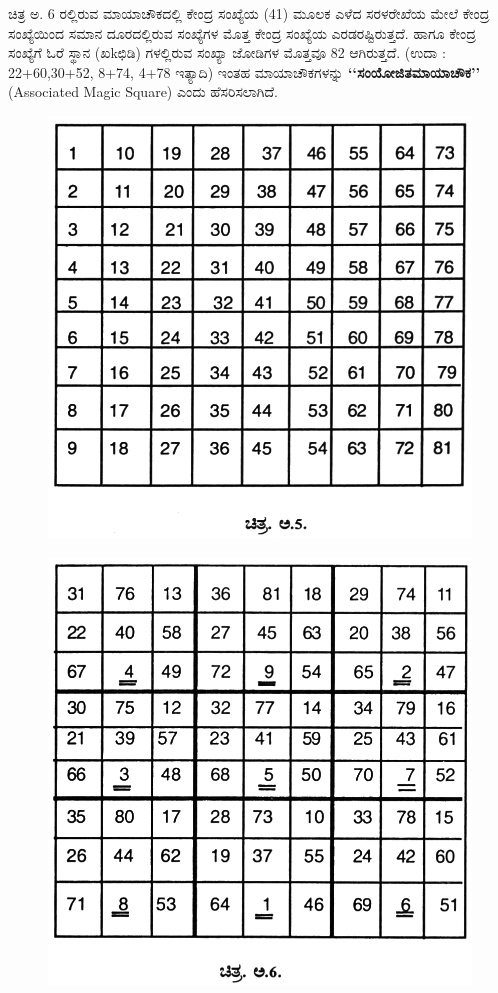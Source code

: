 ಚಿತ್ರ ಅ. 6 ರಲ್ಲಿರುವ ಮಾಯಾಚೌಕದಲ್ಲಿ ಕೇಂದ್ರ ಸಂಖ್ಯೆಯ (41) ಮೂಲಕ ಎಳೆದ ಸರಳರೇಖೆಯ ಮೇಲೆ ಕೇಂದ್ರ ಸಂಖ್ಯೆಯಿಂದ ಸಮಾನ ದೂರದಲ್ಲಿರುವ ಸಂಖ್ಯೆಗಳ ಮೊತ್ತ ಕೇಂದ್ರ ಸಂಖ್ಯೆಯ ಎರಡರಷ್ಟಿರುತ್ತದೆ. ಹಾಗೂ ಕೇಂದ್ರ ಸಂಖ್ಯೆಗೆ ಓರೆ ಸ್ಥಾನ (ಖkಛಿಡಿ) ಗಳಲ್ಲಿರುವ ಸಂಖ್ಯಾ ಜೋಡಿಗಳ ಮೊತ್ತವೂ 82 ಆಗಿರುತ್ತದೆ. (ಉದಾ : 22+60,30+52, 8+74, 4+78 ಇತ್ಯಾದಿ) ಇಂತಹ ಮಾಯಾಚೌಕಗಳನ್ನು \textbf{‘‘ಸಂಯೋಜಿತಮಾಯಾಚೌಕ’’} (Associated Magic Square) ಎಂದು ಹೆಸರಿಸಲಾಗಿದೆ.
\begin{figure}[H]
\includegraphics{src/figures/chap9/fig9.4.jpg}
\end{figure}
\begin{figure}[H]
\includegraphics{src/figures/chap9/fig9.5.jpg}
\end{figure}

